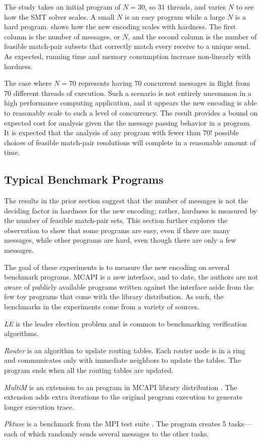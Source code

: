 The study takes an initial program of $N = 30$, so 31 threads, and
varies $N$ to see how the SMT solver scales. A small $N$ is an easy
program while a large $N$ is a hard program. 
shows how the new encoding scales with hardness. The first column is
the number of messages, or $N$, and the second column is the number of
feasible match-pair subsets that correctly match every receive to a
unique send. As expected, running time and memory consumption increase
non-linearly with hardness.

The case where $N=70$ represents having 70 concurrent messages in
flight from 70 different threads of execution. Such a scenario is not
entirely uncommon in a high performance computing application, and it
appears the new encoding is able to reasonably scale to such a level
of concurrency. The result provides a bound on expected cost for
analysis given the the message passing behavior in a program. It is
expected that the analysis of any program with fewer than $70!$
possible choices of feasible match-pair resolutions will complete in a
reasonable amount of time.

\subsection{Typical Benchmark Programs}
The results in the prior section suggest that the number of messages
is not the deciding factor in hardness for the new encoding; rather,
hardness is measured by the number of feasible match-pair sets. This
section further explores the observation to show that some programs
are easy, even if there are many messages, while other programs are
hard, even though there are only a few messages.

The goal of these experiments is to measure the new encoding on
several benchmark programs. MCAPI is a new interface, and to date, the
authors are not aware of publicly available programs written against
the interface aside from the few toy programs that come with the
library distribution. As such, the benchmarks in the experiments come
from a variety of sources.
\begin{compactitem}
\item \textit{LE} is the leader election problem and is common to
  benchmarking verification algorithms.
\item \textit{Router} is an algorithm to update routing tables. Each
  router node is in a ring and communicates only with immediate
  neighbors to update the tables. The program ends when all the
  routing tables are updated.
\item \textit{MultiM} is an extension to an program in MCAPI library
  distribution . The extension adds extra
  iterations to the original program execution to generate longer
  execution trace.
\item \textit{Pktuse} is a benchmark from the MPI test suite
  \cite{mpptest_benchmark}. The program creates 5 tasks---each of
  which randomly sends several messages to the other tasks.
\end{compactitem}

